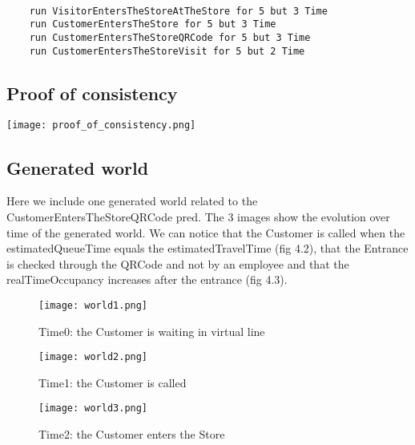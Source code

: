 \begin{lstlisting}[language=alloy]
    
    run VisitorEntersTheStoreAtTheStore for 5 but 3 Time
    run CustomerEntersTheStore for 5 but 3 Time
    run CustomerEntersTheStoreQRCode for 5 but 3 Time
    run CustomerEntersTheStoreVisit for 5 but 2 Time

\end{lstlisting}

\subsection{Proof of consistency}

    \begin{center}
        \texttt{[image: proof\_of\_consistency.png]}
    \end{center}

\subsection{Generated world}
Here we include one generated world related to the CustomerEntersTheStoreQRCode pred. The 3 images show the evolution over time of the generated world. We can notice that the Customer is called when the estimatedQueueTime equals the estimatedTravelTime (fig 4.2), that the Entrance is checked through the QRCode and not by an employee and that the realTimeOccupancy increases after the entrance (fig 4.3).
\clearpage    

    \begin{figure}
        \centering
        \texttt{[image: world1.png]}
        \caption{Time0: the Customer is waiting in virtual line}
    \end{figure}
    \begin{figure}
        \centering
        \texttt{[image: world2.png]}
        \caption{Time1: the Customer is called}
    \end{figure}
    \begin{figure}
        \centering
        \texttt{[image: world3.png]}
        \caption{Time2: the Customer enters the Store}
    \end{figure}